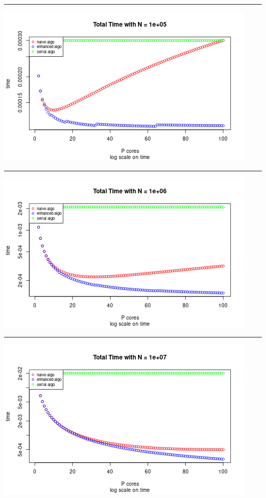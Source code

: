 \documentclass[
  10pt,
]{article}
\begin{document}
\begin{center}\rule{0.5\linewidth}{0.5pt}\end{center}

\begin{center}\includegraphics{figs/time_plots_naive_&_enhanced-2} \end{center}

\begin{center}\rule{0.5\linewidth}{0.5pt}\end{center}

\begin{center}\includegraphics{figs/time_plots_naive_&_enhanced-3} \end{center}

\begin{center}\rule{0.5\linewidth}{0.5pt}\end{center}

\begin{center}\includegraphics{figs/time_plots_naive_&_enhanced-4} \end{center}
\end{document}
